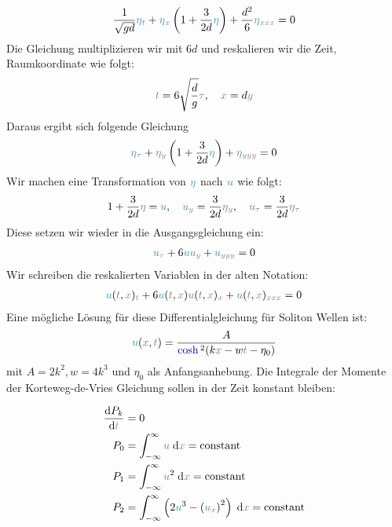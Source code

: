 \documentclass[10pt,fleqn,%
reqno,a4paper]{article}
\makeatletter
\def\mathcolor#1#{\@mathcolor{#1}}
\def\@mathcolor#1#2#3{%
        \protect\leavevmode
        \begingroup\color#1{#2}#3\endgroup
}
\newcommand{\nx}{\mathcolor{gray}{x}}
\newcommand{\ny}{\mathcolor{gray}{y}}
\newcommand{\nt}{\mathcolor{gray}{t}}
\newcommand{\ntau}{\mathcolor{gray}{\tau}}
\newcommand{\neta}{\mathcolor{cyan!70!black}{\eta}}
\newcommand{\nnu}{\mathcolor{cyan!70!black}{u}}
\newcommand{\ncosh}{\mathcolor{blue!70!black}{\cosh}}
\newcommand{\dif}{\mathrm{d}}
\makeatother
\begin{document}
\begin{align*}
        \frac{1}{\sqrt{gd}} \neta _{\nt} +  \neta _{\nx}\left(1 + \frac{3}{2d}\neta  \right) + \frac{d^2}{6}\neta _{\nx\nx\nx}= 0
\end{align*}
Die Gleichung multiplizieren wir mit $ 6d $ und reskalieren wir die Zeit, Raumkoordinate wie folgt:
\begin{align}
        \nt = 6\sqrt{\frac{d}{g}}\ntau, \quad \nx = d \ny \label{g:Trafo1}
\end{align}
Daraus ergibt sich folgende Gleichung
\begin{align*}
        \neta _{\ntau} +  \neta _{\ny}\left(1 + \frac{3}{2d}\neta  \right) + \neta _{\ny\ny\ny}= 0
\end{align*}
Wir machen eine Transformation von $ \neta $ nach $ \nnu $ wie folgt:
\begin{align}
        1 + \frac{3}{2d} \neta = \nnu, \quad \nnu _{\ny} = \frac{3}{2d} \neta _{\ny}, \quad \nnu _{\ntau} = \frac{3}{2d} \neta _{\ntau} \label{g:Trafo2}
\end{align}
Diese setzen wir wieder in die Ausgangsgleichung ein:
\begin{align*}
        \nnu _{\ntau} + 6\nnu \nnu _{\ny} + \nnu _{\ny \ny \ny} = 0
\end{align*}
Wir schreiben die reskalierten Variablen in der alten Notation:
\begin{align}
        \nnu (\nt, \nx) _{\nt} + 6\nnu(\nt, \nx) \nnu (\nt, \nx) _{\nx} + \nnu (\nt, \nx)_{\nx \nx \nx} = 0 \label{g:KoVrf}
\end{align}
Eine mögliche Lösung für diese Differentialgleichung für Soliton Wellen ist:
\begin{align}
        \nnu (\nx, \nt) = \frac{A}{\ncosh ^2(k\nx - w\nt -\eta _{0})} \label{g:loesung}
\end{align}
mit $ A = 2k^2, w = 4k^3 $  und $ \eta _0 $ als Anfangsanhebung. 
Die Integrale der Momente der Korteweg-de-Vries Gleichung sollen in der Zeit konstant bleiben:

\begin{align}
        \frac{\dif P_k}{\dif\nt} & = 0 \label{g:Intconst} \\
        P_0 &= \int_{-\infty}^{\infty} \nnu\; \mathrm{d}\nx = \mathrm{constant} \nonumber \\
        P_1 &= \int_{-\infty}^{\infty} \nnu^2\; \mathrm{d}\nx = \mathrm{constant} \nonumber \\
        P_2 &= \int_{-\infty}^{\infty} \left(2\nnu^3 - \left(  \nnu _{ \nx}\right)^2 \right)\;\mathrm{d}\nx = \mathrm{constant} \label{g:Int}
\end{align}
\end{document}
